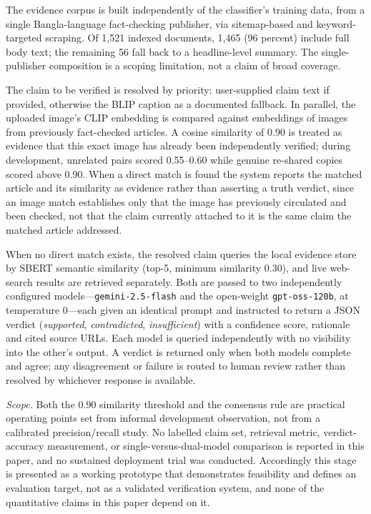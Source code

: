 \documentclass[conference,a4paper]{IEEEtran}
\newcommand{\llmProprietary}{gemini-2.5-flash}
\newcommand{\llmOpen}{gpt-oss-120b}
\begin{document}
The evidence corpus is built independently of the classifier's training data,
from a single Bangla-language fact-checking publisher, via sitemap-based and
keyword-targeted scraping. Of 1{,}521 indexed documents, 1{,}465 (96 percent)
include full body text; the remaining 56 fall back to a headline-level
summary. The single-publisher composition is a scoping limitation, not a claim
of broad coverage.

The claim to be verified is resolved by priority: user-supplied claim text if
provided, otherwise the BLIP caption as a documented fallback. In parallel,
the uploaded image's CLIP embedding is compared against embeddings of images
from previously fact-checked articles. A cosine similarity of 0.90 is treated
as evidence that this exact image has already been independently verified;
during development, unrelated pairs scored 0.55--0.60 while genuine re-shared
copies scored above 0.90. When a direct match is found the system reports the
matched article and its similarity as evidence rather than asserting a truth
verdict, since an image match establishes only that the image has previously
circulated and been checked, not that the claim currently attached to it is
the same claim the matched article addressed.

When no direct match exists, the resolved claim queries the local evidence
store by SBERT semantic similarity (top-5, minimum similarity 0.30), and live
web-search results are retrieved separately. Both are passed to two
independently configured models---\texttt{\llmProprietary} and the open-weight
\texttt{\llmOpen}, at temperature 0---each given an identical prompt and
instructed to return a JSON verdict (\emph{supported}, \emph{contradicted},
\emph{insufficient}) with a confidence score, rationale and cited source URLs.
Each model is queried independently with no visibility into the other's
output. A verdict is returned only when both models complete and agree; any
disagreement or failure is routed to human review rather than resolved by
whichever response is available.

\emph{Scope.} Both the 0.90 similarity threshold and the consensus rule are
practical operating points set from informal development observation, not from
a calibrated precision/recall study. No labelled claim set, retrieval metric,
verdict-accuracy measurement, or single-versus-dual-model comparison is
reported in this paper, and no sustained deployment trial was conducted.
Accordingly this stage is presented as a working prototype that demonstrates
feasibility and defines an evaluation target, not as a validated verification
system, and none of the quantitative claims in this paper depend on it.
\end{document}
